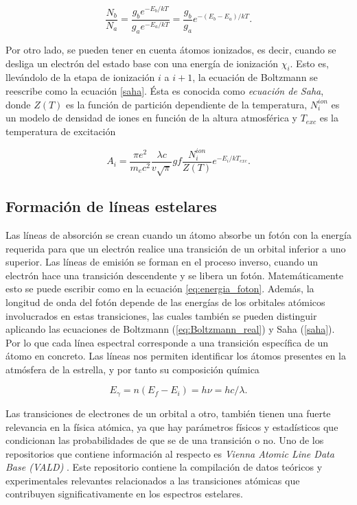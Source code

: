 \documentclass[12pt,oneside,openany,letter]{book}
\begin{document}
\begin{equation}
\frac{N_{b}}{N_{a}}=\frac{g_{b} e^{-E_{b} / k T}}{g_{a} e^{-E_{a} / k T}}=\frac{g_{b}}{g_{a}} e^{-\left(E_{b}-E_{a}\right) / kT}.
\label{eq:Boltzmann_real}
\end{equation}


\noindent Por otro lado, se pueden tener en cuenta átomos ionizados, es decir, cuando se desliga un electrón del estado base con una energía de  ionización $\chi_i$. Esto es, llevándolo de la etapa de ionización $i$ a $i+1$, la ecuación de Boltzmann se reescribe como la ecuación \eqref{saha}. Ésta es conocida como \textit{ecuación de Saha}, donde $Z(T)$ es la función de partición dependiente de la temperatura, $N_i^{ion}$ es un modelo de densidad de iones en función de la altura atmosférica y $T_{exc}$ es la temperatura de excitación

\begin{equation}
A_{i} = \frac{\pi e^{2}}{m_{e} c^{2}} \frac{\lambda c}{v \sqrt{\pi}} g f \frac{N_{i}^{ion}}{Z(T)} e^{-E_{i} / k T_{exc}}.
\label{saha}
\end{equation}

\subsection{Formación de líneas estelares}

Las líneas de absorción se crean cuando un átomo absorbe un fotón con la energía requerida para que un electrón realice una transición de un orbital inferior a uno superior. Las líneas de emisión se forman en el proceso inverso, cuando un electrón hace una transición descendente y se libera un fotón. Matemáticamente esto se puede escribir como en la ecuación \ref{eq:energia_foton}. Además, la longitud de onda del fotón depende de las energías de los orbitales atómicos involucrados en estas transiciones, las cuales también se pueden distinguir aplicando las ecuaciones de Boltzmann (\ref{eq:Boltzmann_real}) y Saha (\ref{saha}). Por lo que cada línea espectral corresponde a una transición específica de un átomo en concreto. Las líneas nos permiten identificar los átomos presentes en la atmósfera de la estrella, y por tanto su composición química

\begin{equation}
    E_{\gamma} = n(E_f - E_i) = h \nu = hc/\lambda.
    \label{eq:energia_foton}
\end{equation}

\noindent Las transiciones de electrones de un orbital a otro, también tienen una fuerte relevancia en la física atómica, ya que hay parámetros físicos y estadísticos que condicionan las probabilidades de que se de una transición o no. Uno de los repositorios que contiene información al respecto es \textit{Vienna Atomic Line Data Base (VALD)} \citep{piskunov1995vald}. Este repositorio contiene la compilación de datos teóricos y experimentales relevantes relacionados a las transiciones atómicas que contribuyen significativamente en los espectros estelares.
\end{document}
